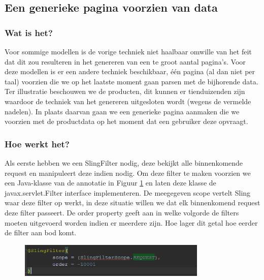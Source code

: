 
	\subsection{Een generieke pagina voorzien van data} 
	\subsubsection{Wat is het?}
    Voor sommige modellen is de vorige techniek niet haalbaar omwille van het feit dat dit zou resulteren in het genereren van een te groot aantal pagina's. Voor deze modellen is er een andere techniek beschikbaar, één pagina (al dan niet per taal) voorzien die we op het laatste moment gaan parsen met de bijhorende data. Ter illustratie beschouwen we de producten, dit kunnen er tienduizenden zijn waardoor de techniek van het genereren uitgesloten wordt (wegens de vermelde nadelen). In plaats daarvan gaan we een generieke pagina aanmaken die we voorzien met de productdata op het moment dat een gebruiker deze opvraagt. 
	\subsubsection{Hoe werkt het?}
    Als eerste hebben we een SlingFilter nodig, deze bekijkt alle binnenkomende request en manipuleert deze indien nodig. Om deze filter te maken voorzien we een Java-klasse van de annotatie in Figuur \ref{fig:sling-filter} en laten deze klasse de javax.servlet.Filter interface implementeren. De meegegeven scope vertelt Sling waar deze filter op werkt, in deze situatie willen we dat elk binnenkomend request deze filter passeert. De \textquotedbl order\textquotedbl{} property geeft aan in welke volgorde de filters moeten uitgevoerd worden indien er meerdere zijn. Hoe lager dit getal hoe eerder de filter aan bod komt.
    
    \begin{figure}[h!]
  		\includegraphics[width=0.8\textwidth]{images/sling-filter.PNG}
  		\label{fig:sling-filter}
	\end{figure}
	
